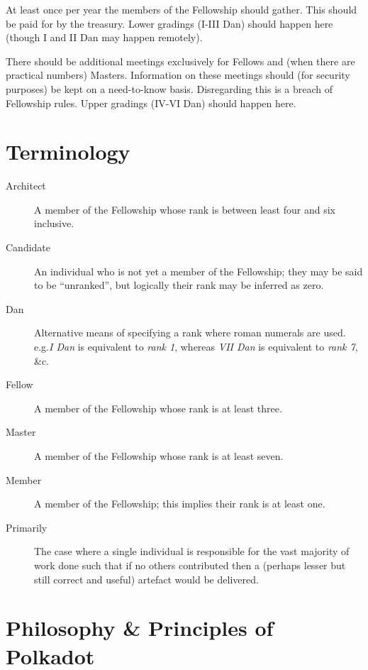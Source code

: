 \documentclass[9pt,oneside]{amsart}
\makeatletter
\newcommand*\Eg{e.g.\@\xspace}
\makeatother
\begin{document}
At least once per year the members of the Fellowship should gather. This should be paid for by the treasury. Lower gradings (I-III Dan) should happen here (though I and II Dan may happen remotely).

There should be additional meetings exclusively for Fellows and (when there are practical numbers) Masters. Information on these meetings should (for security purposes) be kept on a need-to-know basis. Disregarding this is a breach of Fellowship rules. Upper gradings (IV-VI Dan) should happen here.

{}


\appendix

\section{Terminology}\label{terminology}

\begin{description}
  \item[Architect] A member of the Fellowship whose rank is between least four and six inclusive.
  \item[Candidate] An individual who is not yet a member of the Fellowship; they may be said to be ``unranked'', but logically their rank may be inferred as zero.
  \item[Dan] Alternative means of specifying a rank where roman numerals are used. \Eg \emph{I Dan} is equivalent to \emph{rank 1}, whereas \emph{VII Dan} is equivalent to \emph{rank 7}, \&c.
  \item[Fellow] A member of the Fellowship whose rank is at least three.
  \item[Master] A member of the Fellowship whose rank is at least seven.
  \item[Member] A member of the Fellowship; this implies their rank is at least one.
  \item[Primarily] The case where a single individual is responsible for the vast majority of work  done such that if no others contributed then a (perhaps lesser but still correct and useful) artefact would be delivered.
\end{description}

\section{Philosophy \& Principles of Polkadot}\label{philosophy-principles-of-polkadot}
\end{document}
